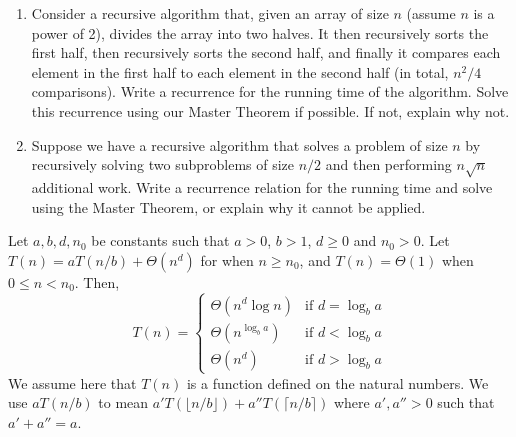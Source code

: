 \documentclass{article}
\begin{document}
\begin{enumerate}
    \item Consider a recursive algorithm that, given an array of size $n$ (assume $n$ is a power of 2), divides the array into two halves. It then recursively sorts the first half, then recursively sorts the second half, and finally it compares each element in the first half to each element in the second half (in total, $n^2/4$ comparisons). Write a recurrence for the running time of the algorithm. Solve this recurrence using our Master Theorem if possible. If not, explain why not.


    \item  Suppose we have a recursive algorithm that solves a problem of size $n$ by recursively solving two subproblems of size $n/2$ and then performing $n\sqrt{n}$ additional work. Write a recurrence relation for the running time and solve using the Master Theorem, or explain why it cannot be applied.

\end{enumerate}

\begin{theorem}
Let $a, b, d, n_0$ be constants such that $a > 0$, $b > 1$, $d \ge 0$ and $n_0 > 0$. Let $T(n) = aT(n/b) + \Theta(n^d)$ for when $n \ge n_0$, and $T(n) = \Theta(1)$ when $0 \le n < n_0$. Then,
\[
T(n) = \begin{cases}
\Theta(n^d \log n) & \text{if } d = \log_b a \\
\Theta(n^{\log_b a}) & \text{if } d < \log_b a \\
\Theta(n^d) & \text{if } d > \log_b a
\end{cases}
\]
We assume here that $T(n)$ is a function defined on the natural numbers. We use $aT(n/b)$ to mean $a'T(\lfloor n/b \rfloor) + a''T(\lceil n/b \rceil)$ where $a', a'' > 0$ such that $a' + a'' = a$.
\end{theorem}
\end{document}

